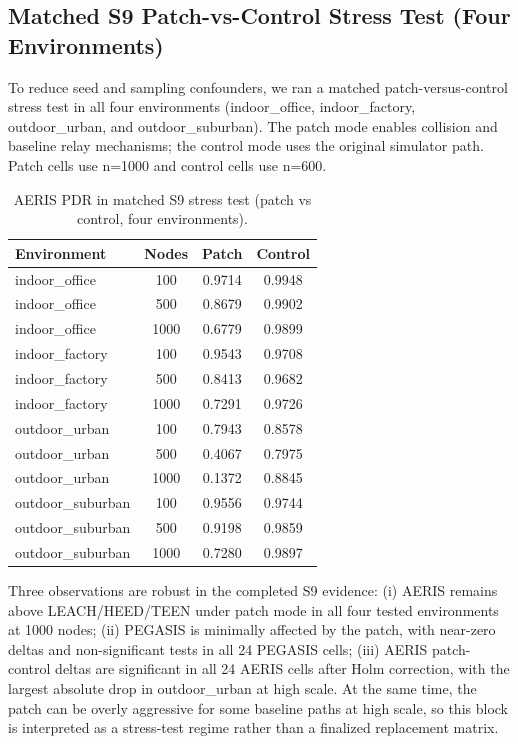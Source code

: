 \documentclass[sensors,article,submit,moreauthors,pdftex]{Definitions/mdpi}
\begin{document}
\subsection{Matched S9 Patch-vs-Control Stress Test (Four Environments)}
To reduce seed and sampling confounders, we ran a matched patch-versus-control stress test in all four environments (indoor\_office, indoor\_factory, outdoor\_urban, and outdoor\_suburban). The patch mode enables collision and baseline relay mechanisms; the control mode uses the original simulator path. Patch cells use n=1000 and control cells use n=600.

\begin{table}[H]
\caption{AERIS PDR in matched S9 stress test (patch vs control, four environments).}
\label{tab:s9_patch_control}
\centering
\begin{tabular}{lccc}
\toprule
Environment & Nodes & Patch & Control \\
\midrule
indoor\_office & 100  & 0.9714 & 0.9948 \\
indoor\_office & 500  & 0.8679 & 0.9902 \\
indoor\_office & 1000 & 0.6779 & 0.9899 \\
indoor\_factory & 100  & 0.9543 & 0.9708 \\
indoor\_factory & 500  & 0.8413 & 0.9682 \\
indoor\_factory & 1000 & 0.7291 & 0.9726 \\
outdoor\_urban & 100  & 0.7943 & 0.8578 \\
outdoor\_urban & 500  & 0.4067 & 0.7975 \\
outdoor\_urban & 1000 & 0.1372 & 0.8845 \\
outdoor\_suburban & 100  & 0.9556 & 0.9744 \\
outdoor\_suburban & 500  & 0.9198 & 0.9859 \\
outdoor\_suburban & 1000 & 0.7280 & 0.9897 \\
\bottomrule
\end{tabular}
\end{table}

Three observations are robust in the completed S9 evidence: (i) AERIS remains above LEACH/HEED/TEEN under patch mode in all four tested environments at 1000 nodes; (ii) PEGASIS is minimally affected by the patch, with near-zero deltas and non-significant tests in all 24 PEGASIS cells; (iii) AERIS patch-control deltas are significant in all 24 AERIS cells after Holm correction, with the largest absolute drop in outdoor\_urban at high scale. At the same time, the patch can be overly aggressive for some baseline paths at high scale, so this block is interpreted as a stress-test regime rather than a finalized replacement matrix.
\end{document}
